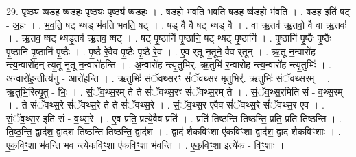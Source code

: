 \documentclass[17pt]{extarticle}
\begin{document}
29. पृष्ठ्य॑ ष्षड॒ह ष्ष॑ड॒हः पृष्ठ्यः॒ पृष्ठ्य॑ ष्षड॒हः । . ष॒ड॒हो भ॑वति भवति षड॒ह ष्ष॑ड॒हो भ॑वति । . ष॒ड॒ह इति॑ षट् - अ॒हः । . भ॒व॒ति॒ षट् थ्षड् भ॑वति भवति॒ षट् । . षड् वै वै षट् थ्षड् वै । . वा ऋ॒तव॑ ऋ॒तवो॒ वै वा ऋ॒तवः॑ । . ऋ॒तव॒ ष्षट् थ्षडृ॒तव॑ ऋ॒तव॒ ष्षट् । . षट् पृ॒ष्ठानि॑ पृ॒ष्ठानि॒ षट् थ्षट् पृ॒ष्ठानि॑ । . पृ॒ष्ठानि॑ पृ॒ष्ठैः पृ॒ष्ठैः पृ॒ष्ठानि॑ पृ॒ष्ठानि॑ पृ॒ष्ठैः । . पृ॒ष्ठै रे॒वैव पृ॒ष्ठैः पृ॒ष्ठै रे॒व । . ए॒व र्‌तू नृ॒तूने॒ वैव र्‌तून् । . ऋ॒तू न॒न्वारो॑ह न्त्य॒न्वारो॑हन् त्यृ॒तू नृ॒तू न॒न्वारो॑हन्ति । . अ॒न्वारो॑ह न्त्यृ॒तुभिर्॑. ऋ॒तुभि॑ र॒न्वारो॑ह न्त्य॒न्वारो॑ह न्त्यृ॒तुभिः॑ । . अ॒न्वारो॑ह॒न्तीत्य॑नु - आरो॑हन्ति । . ऋ॒तुभिः॑ संॅवथ्स॒रꣳ सं॑ॅवथ्स॒र मृ॒तुभिर्॑. ऋ॒तुभिः॑ संॅवथ्स॒रम् । . ऋ॒तुभि॒रित्यृ॒तु - भिः॒ । . सं॒ॅव॒थ्स॒रम् ते ते सं॑ॅवथ्स॒रꣳ सं॑ॅवथ्स॒रम् ते । . सं॒ॅव॒थ्स॒रमिति॑ सं - व॒थ्स॒रम् । . ते सं॑ॅवथ्स॒रे सं॑ॅवथ्स॒रे ते ते सं॑ॅवथ्स॒रे । . सं॒ॅव॒थ्स॒र ए॒वैव सं॑ॅवथ्स॒रे सं॑ॅवथ्स॒र ए॒व । . सं॒ॅव॒थ्स॒र इति॑ सं - व॒थ्स॒रे । . ए॒व प्रति॒ प्रत्ये॒वैव प्रति॑ । . प्रति॑ तिष्ठन्ति तिष्ठन्ति॒ प्रति॒ प्रति॑ तिष्ठन्ति । . ति॒ष्ठ॒न्ति॒ द्वाद॑श॒ द्वाद॑श तिष्ठन्ति तिष्ठन्ति॒ द्वाद॑श । . द्वाद॑ शैकविꣳ॒॒शा ए॑कविꣳ॒॒शा द्वाद॑श॒ द्वाद॑ शैकविꣳ॒॒शाः । . ए॒क॒विꣳ॒॒शा भ॑वन्ति भव न्त्येकविꣳ॒॒शा ए॑कविꣳ॒॒शा भ॑वन्ति । . ए॒क॒विꣳ॒॒शा इत्ये॑क - विꣳ॒॒शाः । \newline
\end{document}
